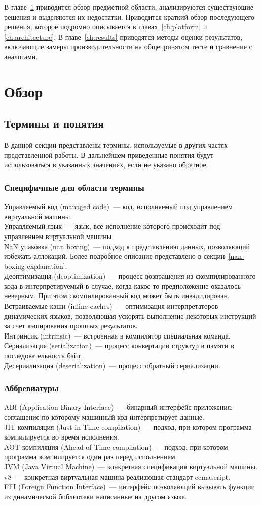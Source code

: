 \documentclass[times,specification,annotation]{itmo-student-thesis}
\begin{document}
В главе~\ref{ch:overview} приводится обзор предметной области, анализируются существующие решения и выделяются их недостатки. Приводится краткий обзор последующего решения, которое подромно описывается в главах~\ref{ch:platform} и \ref{ch:architecture}. В главе~\ref{ch:results} приводятся методы оценки результатов, включающие замеры производительности на общепринятом тесте и сравнение с аналогами.

\chapter{Обзор}\label{ch:overview}

\section{Термины и понятия}
В данной секции представлены термины, используемые в других частях представленной работы. В дальнейшем приведенные понятия будут использоваться в указанных значениях, если не указано обратное.
\def\MakeTerm#1#2{#1~--- #2.\\}
\subsection{Специфичные для области термины}
	\MakeTerm{Управляемый код (managed code)}{код, исполняемый под управлением виртуальной машины}
	\MakeTerm{Управляемый язык}{язык, все исполнение которого происходит под управлением виртуальной машины}
	\MakeTerm{NaN упаковка (nan boxing)}{подход к представлению данных, позволяющий избежать аллокаций. Более подробное описание представлено в секции~\ref{nan-boxing-explanation}}
	\MakeTerm{Деоптимизация (deoptimization)}{процесс возвращения из скомпилированного кода в интерпретируемый в случае, когда какое-то предположение оказалось неверным. При этом скомпилированный код может быть инвалидирован}
	\MakeTerm{Встраиваемые кэши (inline caches)}{оптимизация интерпретаторов динамических языков, позволяющая ускорять выполнение некоторых инструкций за счет кэширования прошлых результатов}
	\MakeTerm{Интринсик (intrinsic)}{встроенная в компилятор специальная команда}
	\MakeTerm{Сериализация (serialization)}{процесс конвертации структур в памяти в последовательность байт}
	\MakeTerm{Десериализация (deserialization)}{процесс обратный сериализации}

\subsection{Аббревиатуры}
	\MakeTerm{ABI (Application Binary Interface)}{бинарный интерфейс приложения: соглашение по которому машинный код интерпретирует данные}
	\MakeTerm{JIT компиляция (Just in Time compilation)}{подход, при котором программа компилируется во время исполнения}
	\MakeTerm{AOT компиляция (Ahead of Time compilation)}{подход, при котором программа компилируется один раз перед исполнением}
	\MakeTerm{JVM (Java Virtual Machine)}{конкретная спецификация виртуальной машины}
	\MakeTerm{v8}{конкретная виртуальная машина реализющая стандарт ecmascript}
	\MakeTerm{FFI (Foreign Function Interface)}{интерфейс позволяющий вызывать функции из динамической библиотеки написанные на другом языке}
\end{document}
